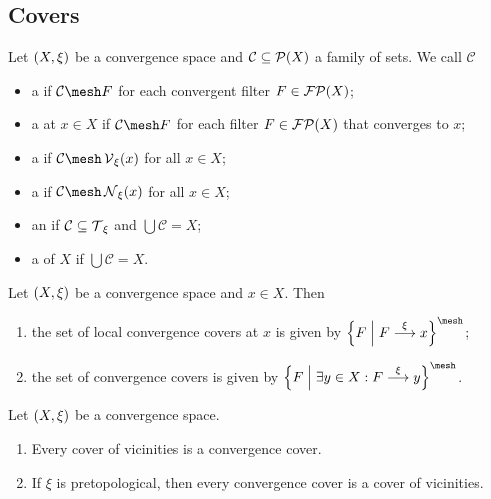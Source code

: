 \subsection{Covers}
\begin{definition}
Let $\sSet{X,\xi}$ be a convergence space and $\mathcal{C}\subseteq \operatorname{\mathcal{P}}(X)$ a family of sets. We call $\mathcal{C}$ 
\begin{itemize}
\item a  if $\mathcal{C}\mesh F$ for each convergent filter $F\in\operatorname{\mathcal{FP}}(X)$;
\item a  at $x\in X$ if $\mathcal{C}\mesh F$ for each filter $F\in\operatorname{\mathcal{FP}}(X)$ that converges to $x$;
\item a  if $\mathcal{C}\mesh \vicinities_\xi(x)$ for all $x\in X$;
\item a  if $\mathcal{C}\mesh \neighbourhoods_\xi(x)$ for all $x\in X$;
\item an  if $\mathcal{C} \subseteq \operatorname{\mathcal{T}}_\xi$ and $\bigcup \mathcal{C} = X$;
\item a  of $X$ if $\bigcup \mathcal{C} = X$.
\end{itemize}
\end{definition}

\begin{lemma}
Let $\sSet{X,\xi}$ be a convergence space and $x\in X$. Then
\begin{enumerate}
\item the set of local convergence covers at $x$ is given by $\setbuilder{F}{F\overset{\xi}{\longrightarrow} x}^\mesh$;
\item the set of convergence covers is given by $\setbuilder{F}{\exists y\in X: F\overset{\xi}{\longrightarrow} y}^\mesh$.
\end{enumerate}
\end{lemma}

\begin{lemma}
Let $\sSet{X,\xi}$ be a convergence space.
\begin{enumerate}
\item Every cover of vicinities is a convergence cover.
\item If $\xi$ is pretopological, then every convergence cover is a cover of vicinities.
\end{enumerate}
\end{lemma}

